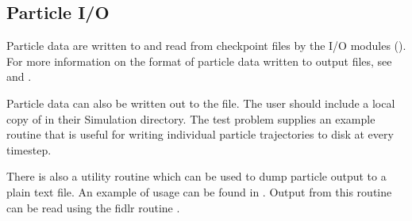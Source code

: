 \subsection{Particle I/O}
\label{Sec:Particles IO}

Particle data are written to and read from checkpoint files by
the I/O modules (). For more
information on the format of particle data written to output files,
see  and .

Particle data can also be written out to the  file.  The user should
include a local copy of  in their Simulation directory.
The  test problem supplies an example 
routine that is useful for writing individual
particle trajectories to disk at every timestep.

There is also a utility routine  which can be used to dump
particle output to a plain text file.  An example of usage can be found in
 .  Output from this routine can be
read using the fidlr routine .

